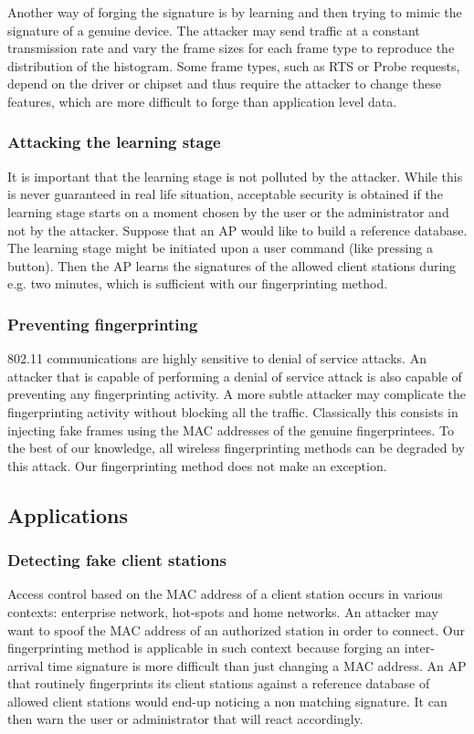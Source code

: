 \documentclass[10pt, conference, compsocconf, letterpaper]{IEEEtran}
\begin{document}
Another way of forging the signature is by learning and then trying to mimic the signature of a genuine device.
The attacker may send traffic at a constant transmission rate and vary the frame sizes for each frame type to reproduce the distribution of the histogram.
Some frame types, such as RTS or Probe requests, depend on the driver or chipset and thus require the attacker to change these features, which are more difficult to forge than application level data.

\subsubsection{Attacking the learning stage}
It is important that the learning stage is not polluted by the attacker.
While this is never guaranteed in real life situation, acceptable security is obtained if the learning stage starts 
on a moment chosen by the user or the administrator and not by the attacker.
Suppose that an AP would like to build a reference database. The learning stage might be initiated upon a user command (like pressing a button).
Then the AP learns the signatures of the allowed client stations during e.g. two minutes, which is sufficient with our fingerprinting method.

\subsubsection{Preventing fingerprinting}
802.11 communications are highly sensitive to denial of service attacks.
An attacker that is capable of performing a denial of service attack is also capable of preventing any fingerprinting activity.
A more subtle attacker may complicate the fingerprinting activity without blocking all the traffic.
Classically this consists in injecting fake frames using the MAC addresses of the genuine fingerprintees.
To the best of our knowledge, all wireless fingerprinting methods can be degraded by this attack.
Our fingerprinting method does not make an exception.



\subsection{Applications}


\subsubsection{Detecting fake client stations}
Access control based on the MAC address of a client station occurs in various contexts: enterprise network, hot-spots and home networks.
An attacker may want to spoof the MAC address of an authorized station in order to connect.
Our fingerprinting method is applicable in such context because forging an inter-arrival time signature is more difficult than just changing a MAC address.
An AP that routinely fingerprints its client stations against a reference database of allowed client stations would end-up noticing a non matching signature.
It can then warn the user or administrator that will react accordingly.
\end{document}
